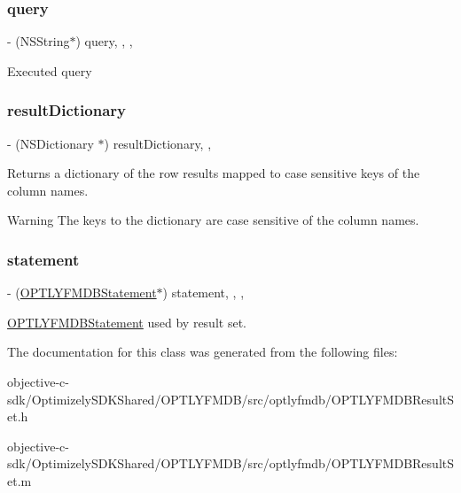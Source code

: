 \subsubsection{\texorpdfstring{query}{query}}
{\footnotesize\ttfamily -\/ (N\+S\+String$\ast$) query\hspace{0.3cm}{\ttfamily [read]}, {\ttfamily [write]}, {\ttfamily [atomic]}, {\ttfamily [retain]}}

Executed query \mbox{\label{interface_o_p_t_l_y_f_m_d_b_result_set_ace597b275ab7cc2b3f351aec058ac048}} 
\subsubsection{\texorpdfstring{result\+Dictionary}{resultDictionary}}
{\footnotesize\ttfamily -\/ (N\+S\+Dictionary $\ast$) result\+Dictionary\hspace{0.3cm}{\ttfamily [read]}, {\ttfamily [nonatomic]}, {\ttfamily [assign]}}

Returns a dictionary of the row results mapped to case sensitive keys of the column names.

\begin{DoxyWarning}{Warning}
The keys to the dictionary are case sensitive of the column names. 
\end{DoxyWarning}
\mbox{\label{interface_o_p_t_l_y_f_m_d_b_result_set_ac1f92d7773e65a7b06489992f8758857}} 
\subsubsection{\texorpdfstring{statement}{statement}}
{\footnotesize\ttfamily -\/ (\mbox{\hyperlink{interface_o_p_t_l_y_f_m_d_b_statement}{O\+P\+T\+L\+Y\+F\+M\+D\+B\+Statement}}$\ast$) statement\hspace{0.3cm}{\ttfamily [read]}, {\ttfamily [write]}, {\ttfamily [atomic]}, {\ttfamily [retain]}}

{\ttfamily \mbox{\hyperlink{interface_o_p_t_l_y_f_m_d_b_statement}{O\+P\+T\+L\+Y\+F\+M\+D\+B\+Statement}}} used by result set. 

The documentation for this class was generated from the following files\+:\begin{DoxyCompactItemize}
\item 
objective-\/c-\/sdk/\+Optimizely\+S\+D\+K\+Shared/\+O\+P\+T\+L\+Y\+F\+M\+D\+B/src/optlyfmdb/O\+P\+T\+L\+Y\+F\+M\+D\+B\+Result\+Set.\+h\item 
objective-\/c-\/sdk/\+Optimizely\+S\+D\+K\+Shared/\+O\+P\+T\+L\+Y\+F\+M\+D\+B/src/optlyfmdb/O\+P\+T\+L\+Y\+F\+M\+D\+B\+Result\+Set.\+m\end{DoxyCompactItemize}

